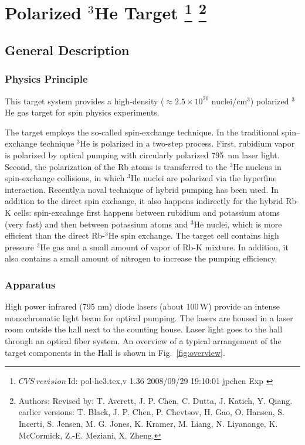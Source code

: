 \chapter[Polarized $^3$He Target]{Polarized $^3$He Target
\footnote{
  $CVS~revision~ $Id: pol-he3.tex,v 1.36 2008/09/29 19:10:01 jpchen Exp $ $
}
\footnote{Authors: Revised by: T. Averett, J. P. Chen, C. Dutta, J. Katich,
Y. Qiang. earlier versions: 
T. Black, J. P. Chen, P. Chevtsov, H. Gao, 
O. Hansen, S. Incerti, S. Jensen, M. G. Jones, K. Kramer, M. Liang, 
N. Liyanange, K. McCormick, Z.-E. Meziani, X. Zheng.
}
}

\section{General Description}
\label{sec:target-he3-general}
\subsection{Physics Principle}

This target system provides a high-density 
($\approx 2.5\times 10^{20}$ nuclei/cm$^3$)
polarized $^3$He gas target for spin physics experiments. 

The target employs the so-called spin-exchange technique.
In the traditional spin--exchange technique $^3$He is polarized in 
a two-step process.
First, rubidium vapor is polarized by optical pumping with
circularly polarized 795~nm laser light. Second, the polarization
of the Rb atoms is transferred to the $^3$He nucleus in spin-exchange
collisions, in which $^3$He nuclei are polarized via the hyperfine interaction.
Recently,a noval technique of hybrid pumping has been used.  
In addition to the direct spin exchange, it also happens indirectly for the 
hybrid Rb-K cells: spin-excahnge first happens between rubidium and potassium atoms 
(very fast) and 
then between potassium atoms and $^3$He nuclei, which is more efficient 
than the direct Rb-$^3$He spin exchange.
The target cell contains high pressure $^3$He gas and a small amount of
vapor of Rb-K mixture. 
In addition, it
also contains a small amount of nitrogen to increase the
pumping efficiency.

\subsection{Apparatus}

High power infrared (795 nm) diode lasers (about 100\,W) provide an intense 
monochromatic
light beam for optical pumping. 
The lasers are housed in a laser room
outside the hall next to the counting house. Laser light goes to the hall 
through an optical fiber system.  An overview of a
typical arrangement of the target components in the Hall is shown in
Fig.~\ref{fig:overview}.

